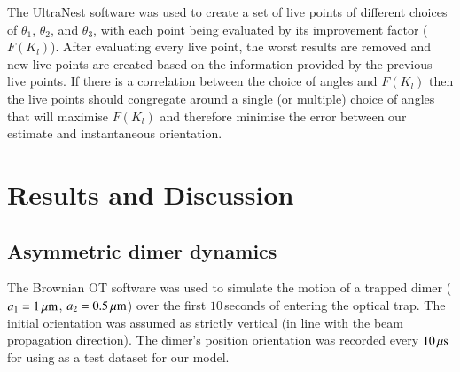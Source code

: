 \documentclass[final, 3p]{elsarticle}
\begin{document}
The UltraNest software was used to create a set of live points of different choices of $\theta_1$, $\theta_2$, and $\theta_3$, with each point being evaluated by its improvement factor ($F(K_l)$). After evaluating every live point, the worst results are removed and new live points are created based on the information provided by the previous live points. If there is a correlation between the choice of angles and $F(K_l)$ then the live points should congregate around a single (or multiple) choice of angles that will maximise $F(K_l)$ and therefore minimise the error between our estimate and instantaneous orientation.


\section{Results and  Discussion}
\label{sec:Discussion}
\subsection{Asymmetric dimer dynamics}
\label{sec:motion}

The Brownian OT software was used to simulate the motion of a trapped
dimer ($a_1=1\,{\rm \mu m}$, $a_2=0.5\,{\rm \mu m}$) over the first
$10$\,seconds of entering the optical trap.  The initial orientation
was assumed as strictly vertical (in line with the beam propagation
direction). The dimer's position orientation was recorded every
$10\,{\rm \mu s}$ for using as a test dataset for our model.
\end{document}
